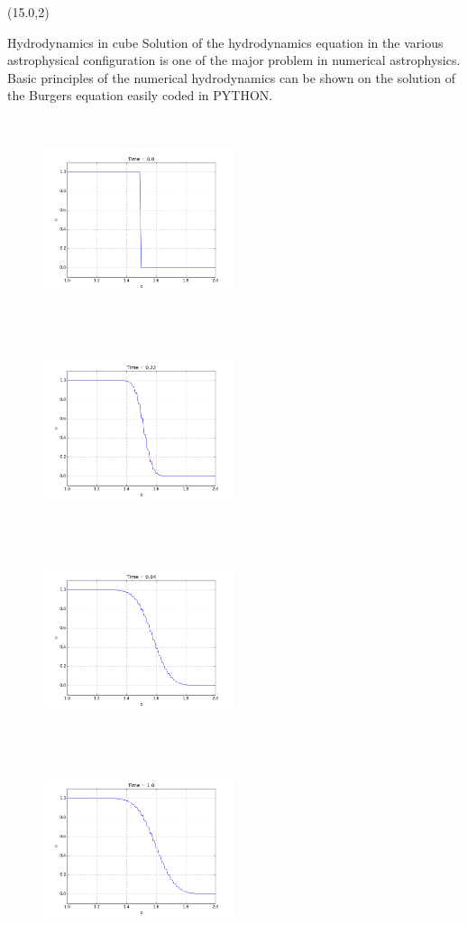 \documentclass[unknownkeysallowed]{beamer}
\begin{document}
\begin{frame}{}
\begin{textblock}{14.00}(15.0,2)
\begin{block}{Hydrodynamics in cube}
Solution of the hydrodynamics equation in the various astrophysical configuration is one of the 
major problem in numerical astrophysics. Basic principles of the numerical hydrodynamics can 
be shown on the solution of the Burgers equation easily coded in PYTHON. 
\begin{figure}
\includegraphics[width=0.5\textwidth, height=6cm]{plt1.png}
\includegraphics[width=0.5\textwidth, height=6cm]{plt2.png}\\
\includegraphics[width=0.5\textwidth, height=6cm]{plt3.png}
\includegraphics[width=0.5\textwidth, height=6cm]{plt4.png}\\
\end{figure}
\end{block}
\end{textblock}

\end{frame}
\end{document}
